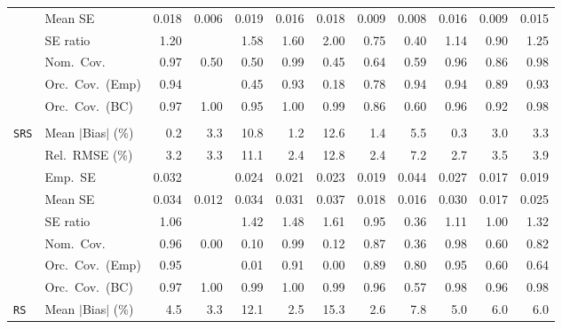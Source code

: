 \begin{landscape}
\begin{longtable}{llrrrrrrrrrr}
 & Mean SE & 0.018 & 0.006 & 0.019 & 0.016 & 0.018 & 0.009 & 0.008 & 0.016 & 0.009 & 0.015 \\
 & SE ratio & \cellcolor{rankthree}1.20 &  & 1.58 & 1.60 & 2.00 & 0.75 & 0.40 & \cellcolor{ranktwo}1.14 & \cellcolor{rankone}0.90 & 1.25 \\
 & Nom.\ Cov. & \cellcolor{ranktwo}0.97 & 0.50 & 0.50 & 0.99 & 0.45 & 0.64 & 0.59 & \cellcolor{rankone}0.96 & 0.86 & \cellcolor{rankthree}0.98 \\
 & Orc.\ Cov.\ (Emp) & \cellcolor{rankone}0.94 &  & 0.45 & 0.93 & 0.18 & 0.78 & \cellcolor{rankthree}0.94 & \cellcolor{ranktwo}0.94 & 0.89 & 0.93 \\
 & Orc.\ Cov.\ (BC) & \cellcolor{rankthree}0.97 & 1.00 & \cellcolor{rankone}0.95 & 1.00 & 0.99 & 0.86 & 0.60 & \cellcolor{ranktwo}0.96 & 0.92 & 0.98 \\
\addlinespace[2pt]
\multicolumn{12}{l}{\textbf{Continuous Phase-One Covariates}} \\
\addlinespace[2pt]
\quad \texttt{SRS} & Mean $|$Bias$|$ (\%) & \cellcolor{rankone}0.2 & 3.3 & 10.8 & \cellcolor{rankthree}1.2 & 12.6 & 1.4 & 5.5 & \cellcolor{ranktwo}0.3 & 3.0 & 3.3 \\
 & Rel.\ RMSE (\%) & 3.2 & 3.3 & 11.1 & \cellcolor{ranktwo}2.4 & 12.8 & \cellcolor{rankone}2.4 & 7.2 & \cellcolor{rankthree}2.7 & 3.5 & 3.9 \\
 & Emp.\ SE & 0.032 &  & 0.024 & 0.021 & 0.023 & 0.019 & 0.044 & 0.027 & 0.017 & 0.019 \\
 & Mean SE & 0.034 & 0.012 & 0.034 & 0.031 & 0.037 & 0.018 & 0.016 & 0.030 & 0.017 & 0.025 \\
 & SE ratio & \cellcolor{rankthree}1.06 &  & 1.42 & 1.48 & 1.61 & \cellcolor{ranktwo}0.95 & 0.36 & 1.11 & \cellcolor{rankone}1.00 & 1.32 \\
 & Nom.\ Cov. & \cellcolor{rankone}0.96 & 0.00 & 0.10 & \cellcolor{rankthree}0.99 & 0.12 & 0.87 & 0.36 & \cellcolor{ranktwo}0.98 & 0.60 & 0.82 \\
 & Orc.\ Cov.\ (Emp) & \cellcolor{ranktwo}0.95 &  & 0.01 & \cellcolor{rankthree}0.91 & 0.00 & 0.89 & 0.80 & \cellcolor{rankone}0.95 & 0.60 & 0.64 \\
 & Orc.\ Cov.\ (BC) & \cellcolor{rankthree}0.97 & 1.00 & 0.99 & 1.00 & 0.99 & \cellcolor{ranktwo}0.96 & 0.57 & 0.98 & \cellcolor{rankone}0.96 & 0.98 \\
\addlinespace[2pt]
\quad \texttt{RS} & Mean $|$Bias$|$ (\%) & 4.5 & \cellcolor{rankthree}3.3 & 12.1 & \cellcolor{rankone}2.5 & 15.3 & \cellcolor{ranktwo}2.6 & 7.8 & 5.0 & 6.0 & 6.0 \\

\end{longtable}
\end{landscape}
